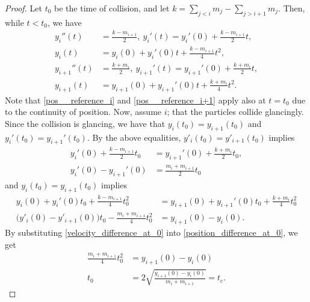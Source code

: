 \documentclass[11pt]{article}
\numberwithin{equation}{section}
\begin{document}
        \begin{proof}
            Let $t_0$ be the time of collision, and let $k = \sum_{j < i}{m_j} - \sum_{j > i + 1}{m_j}$. Then, while $t < t_0$, we have 
            \begin{align}
                y_i''(t) &= \frac{k - m_{i+1}}{2}, \ 
                y_i'(t) = y_i'(0) + \frac{k - m_{i+1}}{2} t, \label{vel__reference_i}\\
                y_i(t) &= y_i(0) + y_i'(0)t + \frac{k - m_{i+1}}{4} t^2, \label{pos__reference_i}\\
                y_{i+1}''(t) &= \frac{k + m_{i}}{2},\ 
                y_{i+1}'(t) = y_{i+1}'(0) + \frac{k + m_{i}}{2} t, \label{vel__reference_i+1}\\
                y_{i+1}(t) &= y_{i+1}(0) + y_{i+1}'(0) t + \frac{k + m_{i}}{4} t^2. \label{pos__reference_i+1}
            \end{align}
            Note that \eqref{pos__reference_i} and \eqref{pos__reference_i+1} apply also at $t=t_0$ due to the continuity of position. Now, assume $i$; that the particles collide glancingly. Since the collision is glancing, we have that $y_i(t_0) = y_{i+1}(t_0)$ and $y_i'(t_0) = y_{i+1}'(t_0)$. By the above equalities, $y'_i(t_0) = y'_{i+1}(t_0)$ implies
            \begin{align}
                y_i'(0) + \frac{k - m_{i+1}}{2} t_0 &= y_{i+1}'(0) + \frac{k + m_{i}}{2} t_0,\nonumber \\
                y_i'(0) - y_{i+1}'(0) &= \frac{m_i + m_{i+1}}{2} t_0 \label{velocity_difference_at_0}
            \end{align}
            and $y_i(t_0) = y_{i+1}(t_0)$ implies
            \begin{align}
                y_i(0) + y_i'(0)t_0 + \frac{k - m_{i+1}}{4} t_0^2 &= y_{i+1}(0) + y_{i+1}'(0)t_0 + \frac{k + m_{i}}{4} t_0^2 \nonumber\\
                \big( y'_i(0) - y'_{i+1}(0) \big) t_0 - \frac{m_i + m_{i+1}}{4}t_0^2 &= y_{i+1}(0) - y_i(0). \label{position_difference_at_0}
            \end{align}
            By substituting \eqref{velocity_difference_at_0} into \eqref{position_difference_at_0}, we get
            \begin{align*}
                \frac{m_i + m_{i+1}}{4}t_0^2 &= y_{i+1}(0) - y_i(0) 
                \\
                t_0 &= 2\sqrt{\frac{y_{i+1}(0) - y_i(0)}{m_i + m_{i+1}}} = t_c.
            \end{align*}

\end{proof}
\end{document}
